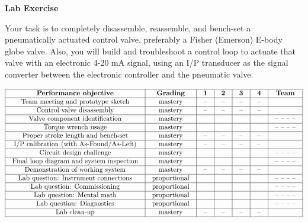 

\noindent
{\bf Lab Exercise}

\vskip 5pt

Your task is to completely disassemble, reassemble, and bench-set a pneumatically actuated control valve, preferably a Fisher (Emerson) E-body globe valve.  Also, you will build and troubleshoot a control loop to actuate that valve with an electronic 4-20 mA signal, using an I/P transducer as the signal converter between the electronic controller and the pneumatic valve.  



$$\vbox{\offinterlineskip
\halign{\strut
\vrule \quad\hfil # \ \hfil & 
\vrule \quad\hfil # \ \hfil & 
\vrule \quad\hfil # \ \hfil & 
\vrule \quad\hfil # \ \hfil & 
\vrule \quad\hfil # \ \hfil & 
\vrule \quad\hfil # \ \hfil & 
\vrule \quad\hfil # \ \hfil \vrule \cr
\noalign{\hrule}
%
{\bf Performance objective} & {\bf Grading} & {\bf 1} & {\bf 2} & {\bf 3} & {\bf 4} & {\bf Team} \cr
%
\noalign{\hrule}
%
Team meeting and prototype sketch & mastery & -- & -- & -- & -- & \cr
%
\noalign{\hrule}
%
Control valve disassembly & mastery & -- & -- & -- & -- & \cr
%
\noalign{\hrule}
%
Valve component identification & mastery & & & & & -- -- -- -- \cr
%
\noalign{\hrule}
%
Torque wrench usage & mastery & & & & & -- -- -- -- \cr
%
\noalign{\hrule}
%
Proper stroke length and bench-set & mastery & -- & -- & -- & -- & \cr
%
\noalign{\hrule}
%
I/P calibration (with As-Found/As-Left) & mastery & -- & -- & -- & -- &  \cr
%
\noalign{\hrule}
%
Circuit design challenge & mastery & & & & & -- -- -- -- \cr
%
\noalign{\hrule}
%
Final loop diagram and system inspection & mastery & & & & & -- -- -- -- \cr
%
\noalign{\hrule}
%
Demonstration of working system & mastery & -- & -- & -- & -- & \cr
%
\noalign{\hrule}
%
Lab question: Instrument connections & proportional &  &  &  &  & -- -- -- -- \cr
%
\noalign{\hrule}
%
Lab question: Commissioning & proportional &  &  &  &  & -- -- -- -- \cr
%
\noalign{\hrule}
%
Lab question: Mental math & proportional &  &  &  &  & -- -- -- -- \cr
%
\noalign{\hrule}
%
Lab question: Diagnostics & proportional &  &  &  &  & -- -- -- -- \cr
%
\noalign{\hrule}
%
Lab clean-up & mastery & -- & -- & -- & -- &  \cr
%
\noalign{\hrule}
} %
}$$ %

